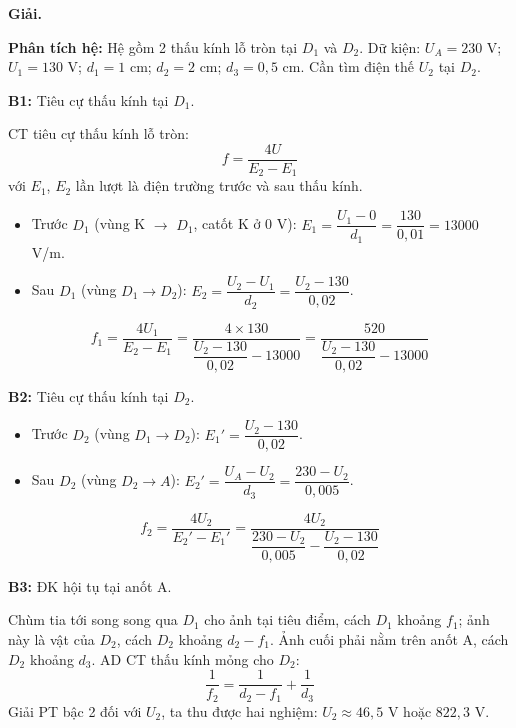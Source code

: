 \documentclass[11pt,a4paper]{article}
\begin{document}
\textbf{Giải.}

\textbf{Phân tích hệ:} Hệ gồm 2 thấu kính lỗ tròn tại $D_1$ và $D_2$. Dữ kiện: $U_A = 230$ V; $U_1 = 130$ V; $d_1 = 1$ cm; $d_2 = 2$ cm; $d_3 = 0{,}5$ cm. Cần tìm điện thế $U_2$ tại $D_2$.

\textbf{B1:} Tiêu cự thấu kính tại $D_1$.

CT tiêu cự thấu kính lỗ tròn:
\begin{equation*}
    f = \frac{4U}{E_2 - E_1}
\end{equation*}
với $E_1$, $E_2$ lần lượt là điện trường trước và sau thấu kính.
\begin{itemize}[label=\textbullet, leftmargin=1.5em, itemsep=1pt, topsep=1pt, parsep=0pt]
    \item Trước $D_1$ (vùng K $\to$ $D_1$, catốt K ở 0 V): $E_1 = \dfrac{U_1 - 0}{d_1} = \dfrac{130}{0{,}01} = 13000$ V/m.
    \item Sau $D_1$ (vùng $D_1 \to D_2$): $E_2 = \dfrac{U_2 - U_1}{d_2} = \dfrac{U_2 - 130}{0{,}02}$.
\end{itemize}
\begin{equation*}
    f_1 = \frac{4U_1}{E_2 - E_1} = \frac{4 \times 130}{\dfrac{U_2 - 130}{0{,}02} - 13000} = \frac{520}{\dfrac{U_2 - 130}{0{,}02} - 13000}
\end{equation*}

\textbf{B2:} Tiêu cự thấu kính tại $D_2$.
\begin{itemize}[label=\textbullet, leftmargin=1.5em, itemsep=1pt, topsep=1pt, parsep=0pt]
    \item Trước $D_2$ (vùng $D_1 \to D_2$): $E_1' = \dfrac{U_2 - 130}{0{,}02}$.
    \item Sau $D_2$ (vùng $D_2 \to A$): $E_2' = \dfrac{U_A - U_2}{d_3} = \dfrac{230 - U_2}{0{,}005}$.
\end{itemize}
\begin{equation*}
    f_2 = \frac{4U_2}{E_2' - E_1'} = \frac{4U_2}{\dfrac{230 - U_2}{0{,}005} - \dfrac{U_2 - 130}{0{,}02}}
\end{equation*}

\textbf{B3:} ĐK hội tụ tại anốt A.

Chùm tia tới song song qua $D_1$ cho ảnh tại tiêu điểm, cách $D_1$ khoảng $f_1$; ảnh này là vật của $D_2$, cách $D_2$ khoảng $d_2 - f_1$. Ảnh cuối phải nằm trên anốt A, cách $D_2$ khoảng $d_3$. AD CT thấu kính mỏng cho $D_2$:
\begin{equation*}
    \frac{1}{f_2} = \frac{1}{d_2 - f_1} + \frac{1}{d_3}
\end{equation*}
Giải PT bậc 2 đối với $U_2$, ta thu được hai nghiệm: $U_2 \approx 46{,}5$ V hoặc $822{,}3$ V.
\end{document}
